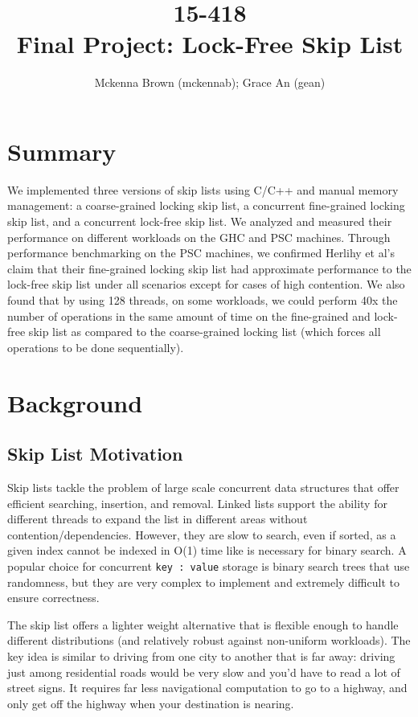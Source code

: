 \documentclass[11pt]{article}
\title{15-418\\
       Final Project: Lock-Free Skip List}
\author{Mckenna Brown (mckennab); Grace An (gean)}
\newcommand{\ttt}[1]{\texttt{#1}}
\begin{document}
\maketitle

\section{Summary}
We implemented three versions of skip lists using C/C++ and manual memory management: a coarse-grained locking skip list, a concurrent fine-grained locking skip list, and a concurrent lock-free skip list. We analyzed and measured their performance on different workloads on the GHC and PSC machines. Through performance benchmarking on the PSC machines, we confirmed Herlihy et al's claim that their fine-grained locking skip list had approximate performance to the lock-free skip list under all scenarios except for cases of high contention. We also found that by using 128 threads, on some workloads, we could perform 40x the number of operations in the same amount of time on the fine-grained and lock-free skip list as compared to the coarse-grained locking list (which forces all operations to be done sequentially). 
\section{Background}
\subsection{Skip List Motivation}
Skip lists tackle the problem of large scale concurrent data structures that offer efficient searching, insertion, and removal. Linked lists support the ability for different threads to expand the list in different areas without contention/dependencies. However, they are slow to search, even if sorted, as a given index cannot be indexed in O(1) time like is necessary for binary search. A popular choice for concurrent \ttt{key : value} storage is binary search trees that use randomness, but they are very complex to implement and extremely difficult to ensure correctness.

The skip list offers a lighter weight alternative that is flexible enough to handle different distributions (and relatively robust against non-uniform workloads). The key idea is similar to driving from one city to another that is far away: driving just among residential roads would be very slow and you'd have to read a lot of street signs. It requires far less navigational computation to go to a highway, and only get off the highway when your destination is nearing.
\end{document}
